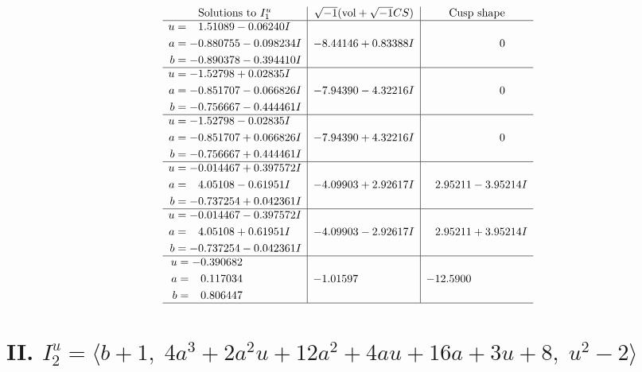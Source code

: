 \documentclass[1p]{elsarticle_modified}
\theoremstyle{definition}
\newcommand{\I}{\sqrt{-1}}
\begin{document}
$$\begin{array}{c|c|c}
\text{Solutions to }I^u_{1}& \I (\text{vol} + \sqrt{-1}CS) & \text{Cusp shape}\\
 \hline 
\begin{aligned}
u &= \phantom{-}1.51089 - 0.06240 I \\
a &= -0.880755 - 0.098234 I \\
b &= -0.890378 - 0.394410 I\end{aligned}
 & -8.44146 + 0.83388 I & \phantom{-0.000000 } 0 \\ \hline\begin{aligned}
u &= -1.52798 + 0.02835 I \\
a &= -0.851707 - 0.066826 I \\
b &= -0.756667 - 0.444461 I\end{aligned}
 & -7.94390 - 4.32216 I & \phantom{-0.000000 } 0 \\ \hline\begin{aligned}
u &= -1.52798 - 0.02835 I \\
a &= -0.851707 + 0.066826 I \\
b &= -0.756667 + 0.444461 I\end{aligned}
 & -7.94390 + 4.32216 I & \phantom{-0.000000 } 0 \\ \hline\begin{aligned}
u &= -0.014467 + 0.397572 I \\
a &= \phantom{-}4.05108 - 0.61951 I \\
b &= -0.737254 + 0.042361 I\end{aligned}
 & -4.09903 + 2.92617 I & \phantom{-}2.95211 - 3.95214 I \\ \hline\begin{aligned}
u &= -0.014467 - 0.397572 I \\
a &= \phantom{-}4.05108 + 0.61951 I \\
b &= -0.737254 - 0.042361 I\end{aligned}
 & -4.09903 - 2.92617 I & \phantom{-}2.95211 + 3.95214 I \\ \hline\begin{aligned}
u &= -0.390682\phantom{ +0.000000I} \\
a &= \phantom{-}0.117034\phantom{ +0.000000I} \\
b &= \phantom{-}0.806447\phantom{ +0.000000I}\end{aligned}
 & -1.01597\phantom{ +0.000000I} & -12.5900\phantom{ +0.000000I}\\
 \hline 
 \end{array}$$\newpage\newpage\renewcommand{\arraystretch}{1}
\centering \section*{II. $I^u_{2}= \langle b+1,\;4 a^3+2 a^2 u+12 a^2+4 a u+16 a+3 u+8,\;u^2-2 \rangle$}
\end{document}

